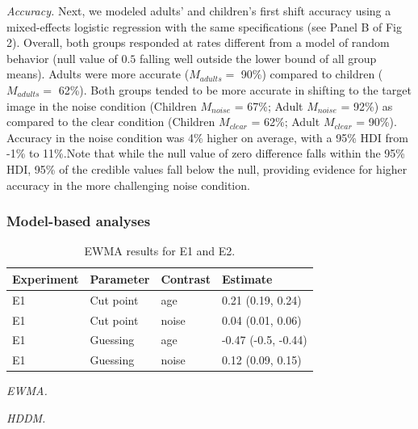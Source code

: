 \documentclass[10pt, letterpaper]{article}
\begin{document}
\emph{Accuracy.} Next, we modeled adults' and children's first shift
accuracy using a mixed-effects logistic regression with the same
specifications (see Panel B of Fig 2). Overall, both groups responded at
rates different from a model of random behavior (null value of \(0.5\)
falling well outside the lower bound of all group means). Adults were
more accurate (\(M_{adults} =\) 90\%) compared to children
(\(M_{adults} =\) 62\%). Both groups tended to be more accurate in
shifting to the target image in the noise condition (Children
\(M_{noise}\) = 67\%; Adult \(M_{noise}\) = 92\%) as compared to the
clear condition (Children \(M_{clear}\) = 62\%; Adult \(M_{clear}\) =
90\%). Accuracy in the noise condition was 4\% higher on average, with a
95\% HDI from -1\% to 11\%.Note that while the null value of zero
difference falls within the 95\% HDI, 95\% of the credible values fall
below the null, providing evidence for higher accuracy in the more
challenging noise condition.

\subsubsection{Model-based analyses}\label{model-based-analyses}

\begin{table}[b]
\centering
\begin{tabular}{llll}
  \hline
Experiment & Parameter & Contrast & Estimate \\ 
  \hline
E1 & Cut point & age & 0.21 (0.19, 0.24) \\ 
  E1 & Cut point & noise & 0.04 (0.01, 0.06) \\ 
  E1 & Guessing & age & -0.47 (-0.5, -0.44) \\ 
  E1 & Guessing & noise & 0.12 (0.09, 0.15) \\ 
   \hline
\end{tabular}
\caption{EWMA results for E1 and E2.} 
\end{table}

\emph{EWMA.}

\emph{HDDM.}
\end{document}

